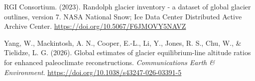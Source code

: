 \documentclass[
]{agujournal2019}
\newlength{\cslhangindent}
\newenvironment{CSLReferences}[2] %
 {\begin{list}{}{%
  \setlength{\itemindent}{0pt}
  \setlength{\leftmargin}{0pt}
  \setlength{\parsep}{0pt}
  \ifodd #1
   \setlength{\leftmargin}{\cslhangindent}
   \setlength{\itemindent}{-1\cslhangindent}
  \fi
  \setlength{\itemsep}{#2\baselineskip}}}
 {\end{list}}
\begin{document}
\begin{CSLReferences}{1}{0}
RGI Consortium. (2023). Randolph glacier inventory - a dataset of global
glacier outlines, version 7. NASA National Snow; Ice Data Center
Distributed Active Archive Center.
\url{https://doi.org/10.5067/F6JMOVY5NAVZ}

Yang, W., Mackintosh, A. N., Cooper, E.-L., Li, Y., Jones, R. S., Chu,
W., \& Tielidze, L. G. (2026). Global estimates of glacier
equilibrium-line altitude ratios for enhanced paleoclimate
reconstructions. \emph{Communications Earth \& Environment}.
\url{https://doi.org/10.1038/s43247-026-03391-5}

\end{CSLReferences}
\end{document}
